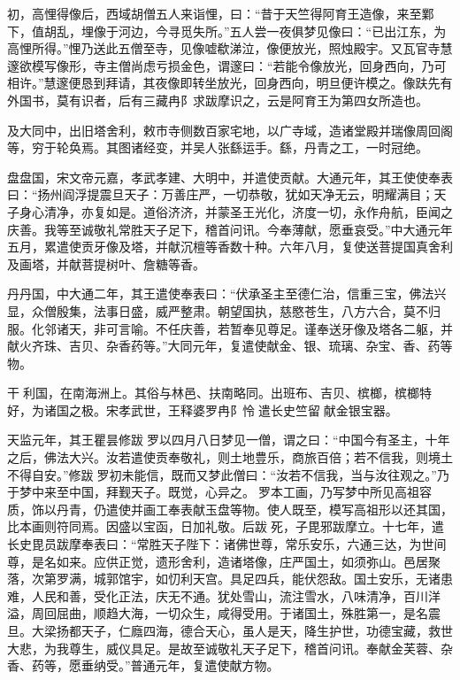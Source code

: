 \documentclass[12pt,UTF8]{ctexbook}
\begin{document}
初，高悝得像后，西域胡僧五人来诣悝，曰：“昔于天竺得阿育王造像，来至鄴下，值胡乱，埋像于河边，今寻觅失所。”五人尝一夜俱梦见像曰：“已出江东，为高悝所得。”悝乃送此五僧至寺，见像嘘欷涕泣，像便放光，照烛殿宇。又瓦官寺慧邃欲模写像形，寺主僧尚虑亏损金色，谓邃曰：“若能令像放光，回身西向，乃可相许。”慧邃便恳到拜请，其夜像即转坐放光，回身西向，明旦便许模之。像趺先有外国书，莫有识者，后有三藏冉阝求跋摩识之，云是阿育王为第四女所造也。

及大同中，出旧塔舍利，敕市寺侧数百家宅地，以广寺域，造诸堂殿并瑞像周回阁等，穷于轮奂焉。其图诸经变，并吴人张繇运手。繇，丹青之工，一时冠绝。

盘盘国，宋文帝元嘉，孝武孝建、大明中，并遣使贡献。大通元年，其王使使奉表曰：“扬州阎浮提震旦天子：万善庄严，一切恭敬，犹如天净无云，明耀满目；天子身心清净，亦复如是。道俗济济，并蒙圣王光化，济度一切，永作舟航，臣闻之庆善。我等至诚敬礼常胜天子足下，稽首问讯。今奉薄献，愿垂哀受。”中大通元年五月，累遣使贡牙像及塔，并献沉檀等香数十种。六年八月，复使送菩提国真舍利及画塔，并献菩提树叶、詹糖等香。

丹丹国，中大通二年，其王遣使奉表曰：“伏承圣主至德仁治，信重三宝，佛法兴显，众僧殷集，法事日盛，威严整肃。朝望国执，慈愍苍生，八方六合，莫不归服。化邻诸天，非可言喻。不任庆善，若暂奉见尊足。谨奉送牙像及塔各二躯，并献火齐珠、吉贝、杂香药等。”大同元年，复遣使献金、银、琉璃、杂宝、香、药等物。

干利国，在南海洲上。其俗与林邑、扶南略同。出班布、吉贝、槟榔，槟榔特好，为诸国之极。宋孝武世，王释婆罗冉阝怜遣长史竺留献金银宝器。

天监元年，其王瞿昙修跋罗以四月八日梦见一僧，谓之曰：“中国今有圣主，十年之后，佛法大兴。汝若遣使贡奉敬礼，则土地豊乐，商旅百倍；若不信我，则境土不得自安。”修跋罗初未能信，既而又梦此僧曰：“汝若不信我，当与汝往观之。”乃于梦中来至中国，拜觐天子。既觉，心异之。罗本工画，乃写梦中所见高祖容质，饰以丹青，仍遣使并画工奉表献玉盘等物。使人既至，模写高祖形以还其国，比本画则符同焉。因盛以宝函，日加礼敬。后跋死，子毘邪跋摩立。十七年，遣长史毘员跋摩奉表曰：“常胜天子陛下：诸佛世尊，常乐安乐，六通三达，为世间尊，是名如来。应供正觉，遗形舍利，造诸塔像，庄严国土，如须弥山。邑居聚落，次第罗满，城郭馆宇，如忉利天宫。具足四兵，能伏怨敌。国土安乐，无诸患难，人民和善，受化正法，庆无不通。犹处雪山，流注雪水，八味清净，百川洋溢，周回屈曲，顺趋大海，一切众生，咸得受用。于诸国土，殊胜第一，是名震旦。大梁扬都天子，仁廕四海，德合天心，虽人是天，降生护世，功德宝藏，救世大悲，为我尊生，威仪具足。是故至诚敬礼天子足下，稽首问讯。奉献金芙蓉、杂香、药等，愿垂纳受。”普通元年，复遣使献方物。
\end{document}
